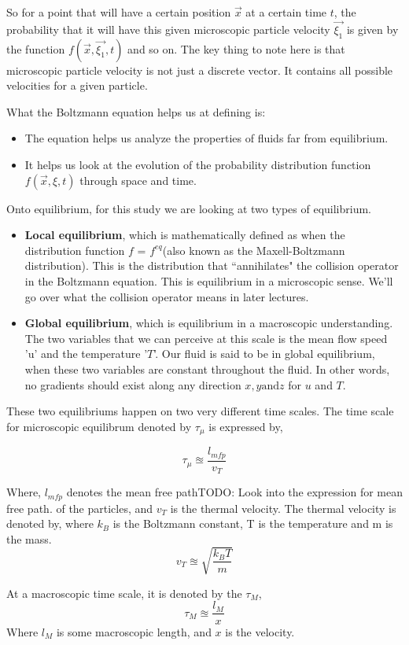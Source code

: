 \documentclass{article}
\begin{document}
So for a point that will have a certain position $\vec{x}$ at a certain time $t$, the probability that it will have this given microscopic particle velocity $\vec{\xi_1}$ is given by the function $f(\vec{x}, \vec{\xi_1}, t)$ and so on. The key thing to note here is that microscopic particle velocity is not just a discrete vector. It contains all possible velocities for a given particle.

What the Boltzmann equation helps us at defining is:
\begin{itemize}
	\item The equation helps us analyze the properties of fluids far from equilibrium.
	\item It helps us look at the evolution of the probability distribution function $f(\vec{x}, \xi, t)$ through space and time.
\end{itemize}
Onto equilibrium, for this study we are looking at two types of equilibrium.
\begin{itemize}
	\item \textbf{Local equilibrium}, which is mathematically defined as when the distribution function $f$ = $f^{eq}$(also known as the Maxell-Boltzmann distribution). This is the distribution that ``annihilates" the collision operator in the Boltzmann equation. This is equilibrium in a microscopic sense. We'll go over what the collision operator means in later lectures.
	\item \textbf{Global equilibrium}, which is equilibrium in a macroscopic understanding. The two variables that we can perceive at this scale is the mean flow speed 'u' and the temperature '$T$'. Our fluid is said to be in global equilibrium, when these two variables are constant throughout the fluid.
		In other words, no gradients should exist along any direction $x, y \text{and} z$ for $u$ and $T$.
\end{itemize}
These two equilibriums happen on two very different time scales.
The time scale for microscopic equilibrum denoted by $\tau_{\mu}$ is expressed by,

\[
	\tau_{\mu} \approxeq \frac{l_{mfp}}{v_T}
\]

Where, $l_{mfp}$ denotes the mean free path{TODO: Look into the expression for mean free path.} of the particles, and $v_T$ is the thermal velocity. The thermal velocity is denoted by, where $k_B$ is the Boltzmann constant, T is the temperature and m is the mass.
\[
	v_T \approxeq \sqrt{\frac{k_BT}{m}}
\]

At a macroscopic time scale, it is denoted by the $\tau_{M}$,
\[
	\tau_{M} \approxeq \frac{l_M}{x}
\]
Where $l_M$ is some macroscopic length, and $x$ is the velocity.
\end{document}
